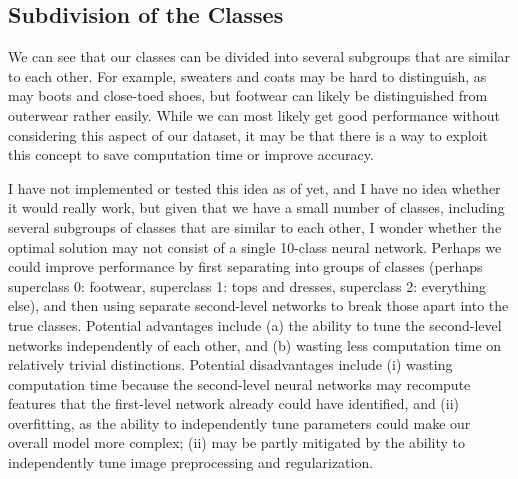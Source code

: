 \subsection{Subdivision of the Classes}
We can see that our classes can be divided into several subgroups that are similar to each other. For example, sweaters and coats may be hard to distinguish, as may boots and close-toed shoes, but footwear can likely be distinguished from outerwear rather easily. While we can most likely get good performance without considering this aspect of our dataset, it may be that there is a way to exploit this concept to save computation time or improve accuracy.

I have not implemented or tested this idea as of yet, and I have no idea whether it would really work, but given that we have a small number of classes, including several subgroups of classes that are similar to each other, I wonder whether the optimal solution may not consist of a single 10-class neural network. Perhaps we could improve performance by first separating into groups of classes (perhaps superclass 0: footwear, superclass 1: tops and dresses, superclass 2: everything else), and then using separate second-level networks to break those apart into the true classes. Potential advantages include (a) the ability to tune the second-level networks independently of each other, and (b) wasting less computation time on relatively trivial distinctions. Potential disadvantages include (i) wasting computation time because the second-level neural networks may recompute features that the first-level network already could have identified, and (ii) overfitting, as the ability to independently tune parameters could make our overall model more complex; (ii) may be partly mitigated by the ability to independently tune image preprocessing and regularization.